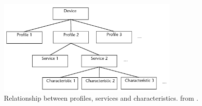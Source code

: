 \begin{figure}[!htb]
\centering
\includegraphics[width=0.8\textwidth]{images/gatt-architecture}
\caption{Relationship between profiles, services and characteristics. from \cite[p. 261]{gupta2013inside}.}
\label{fig:analysis:bluetooth:gatt-architecture}
\end{figure}

